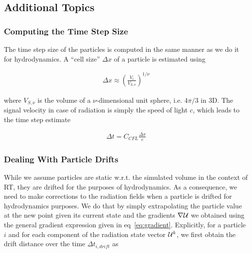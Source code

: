 \subsection{Additional Topics}


\subsubsection{Computing the Time Step Size}

The time step size of the particles is computed in the same manner as we do it for hydrodynamics.
A ``cell size'' $\Delta x$ of a particle is estimated using

\begin{align}
    \Delta x \approx \left(\frac{V_i}{V_{S,\nu}} \right)^{1/\nu}
\end{align}

where $V_{S,\nu}$ is the volume of a $\nu$-dimensional unit sphere, i.e. $4 \pi / 3$ in 3D. The
signal velocity in case of radiation is simply the speed of light $c$, which leads to the time step
estimate

\begin{align}
    \Delta t = C_{CFL} \frac{\Delta x}{c} \label{eq:rt-cfl}
\end{align}



\subsubsection{Dealing With Particle Drifts}\label{chap:rt-drift}

While we assume particles are static w.r.t. the simulated volume in the context of RT, they are
drifted for the purposes of hydrodynamics. As a consequence, we need to make corrections to the
radiation fields when a particle is drifted for hydrodynamics purposes. We do that by simply
extrapolating the particle value at the new point given its current state and the gradients $\nabla
\mathcal{U}$ we obtained using the general gradient expression given in eq~\ref{eq:gradient}. Explicitly, for
a particle $i$ and for each component of the radiation state vector $\mathcal{U}^k$, we first obtain the
drift distance over the time $\Delta t_{i, drift}$ as

